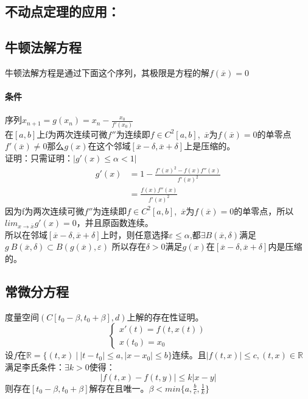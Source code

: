 \documentclass[11pt]{article}
\begin{document}
\begin{CJK*}{UTF8}{gbsn}
\section{不动点定理的应用：}
\subsection{牛顿法解方程}
牛顿法解方程是通过下面这个序列，其极限是方程的解$f(\overline{x})=0$\\

\paragraph{条件} 序列$x_{n+1}=g(x_n)=x_n-\frac{x_0}{f'(x_0)}$\\
在$[a,b]$上f为两次连续可微$f''$为连续即$f\in C^2[a,b]$,~$\overline{x}$为$f(\overline{x} )=0$的单零点$f'(\overline{x} )\neq 0$那么$g(x)$在这个邻域$[\overline{x}-\delta,\overline{x}+\delta ]$上是压缩的。\\

证明：只需证明：$|g'(x)\leq\alpha<1|$\\
\begin{align*}
	g'(x)&=1-\frac{f'(x)^2-f(x)f''(x)}{f'(x)^2}\\
	&=\frac{f(x)f''(x)}{f'(x)^2}
\end{align*}
因为f为两次连续可微$f''$为连续即$f\in C^2[a,b]$,~$\overline{x}$为$f(\overline{x} )=0$的单零点，所以$lim_{x\rightarrow \overline{x}}g'(x)=0$，并且原函数连续。\\
所以在邻域$[\overline{x}-\delta,\overline{x}+\delta ]$上时，则任意选择$\varepsilon\leq \alpha $,都$\exists B(\overline{x},\delta)$满足$g~B(\overline{x},\delta)\subset B(g(\overline x),\varepsilon) $
所以存在$\delta>0$满足$g(x)$在$[\overline{x}-\delta,\overline{x}+\delta ]$内是压缩的。
\subsection{常微分方程}
度量空间$(C[t_0-\beta,t_0+\beta],d)$上解的存在性证明。
\begin{equation}
	\begin{cases}
		x'(t)=f(t,x(t))\\
		x(t_0)=x_0
	\end{cases}
\end{equation}
设$f \mbox{在} \mathbb{R}=\{(t,x)~|~|t-t_0|\leq a,|x-x_0|\leq b \}$连续。且$|f(t,x)|\leq c,(t,x)\in \mathbb{R}$\\
满足李氏条件：$\exists k>0$使得：
\begin{equation}
	|f(t,x)-f(t,y)|\leq k|x-y|
\end{equation}
则存在$[t_0-\beta,t_0+\beta ]$解存在且唯一。$\beta<min\{a,\frac{b}{c},\frac{1}{k} \}$


\end{CJK*}
\end{document}
